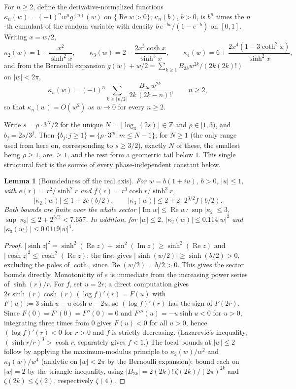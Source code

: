 \documentclass[11pt]{article}
\newtheorem{lemma}[theorem]{Lemma}
\theoremstyle{definition}
\theoremstyle{remark}
\newcommand{\Z}{\mathbb{Z}}
\begin{document}
For $n \ge 2$, define the derivative-normalized functions $\kappa_n(w) = (-1)^n w^n g^{(n)}(w)$ on
$\{\operatorname{Re} w > 0\}$; $\kappa_n(b)$, $b>0$, is $b^n$ times the $n$-th cumulant of the
random variable with density $b\,e^{-bv}/(1-e^{-b})$ on $[0,1]$. Writing $x=w/2$,
\[
\kappa_2(w) = 1 - \frac{x^2}{\sinh^2 x}, \qquad
\kappa_3(w) = 2 - \frac{2x^3\cosh x}{\sinh^3 x}, \qquad
\kappa_4(w) = 6 + \frac{2x^4(1-3\coth^2 x)}{\sinh^2 x},
\]
and from the Bernoulli expansion $g(w)+w/2 = \sum_{k\ge1} B_{2k}w^{2k}/(2k(2k)!)$ on $|w|<2\pi$,
\[
\kappa_n(w) = (-1)^n\!\!\sum_{k\ge\lceil n/2\rceil}\!\! \frac{B_{2k}\,w^{2k}}{2k\,(2k-n)!}, \qquad n\ge2,
\]
so that $\kappa_n(w) = O(w^2)$ as $w \to 0$ for every $n \ge 2$.

Write $s = \rho\cdot 3^N/2$ for the unique $N = \lfloor \log_3(2s)\rfloor \in \Z$ and $\rho \in
[1,3)$, and $b_j = 2s/3^j$. Then $\{b_j : j \ge 1\} = \{\rho\cdot 3^m : m \le N-1\}$; for $N \ge 1$
(the only range used from here on, corresponding to $s \ge 3/2$), exactly $N$ of these, the
smallest being $\rho \ge 1$, are $\ge 1$, and the rest form a geometric tail below $1$. This single
structural fact is the source of every phase-independent constant below.

\begin{lemma}[Boundedness off the real axis]
\label{lem:kappa}
For $w = b(1+iu)$, $b>0$, $|u|\le 1$, with $e(r) = r^2/\sinh^2 r$ and $f(r) = r^3\cosh r/\sinh^3 r$,
\[
|\kappa_2(w)| \le 1 + 2e(b/2), \qquad |\kappa_3(w)| \le 2 + 2\cdot 2^{3/2} f(b/2).
\]
Both bounds are finite over the whole sector $|\operatorname{Im}w|\le\operatorname{Re}w$:
$\sup|\kappa_2|\le3$, $\sup|\kappa_3|\le2+2^{5/2}<7.657$. In addition, for $|w|\le2$,
$|\kappa_2(w)| \le 0.114|w|^2$ and $|\kappa_3(w)|\le 0.0119|w|^4$.
\end{lemma}

\begin{proof}
$|\sinh z|^2 = \sinh^2(\operatorname{Re}z)+\sin^2(\operatorname{Im}z) \ge \sinh^2(\operatorname{Re}z)$
and $|\cosh z|^2 \le \cosh^2(\operatorname{Re}z)$; the first gives $|\sinh(w/2)|\ge\sinh(b/2)>0$,
excluding the poles of $\coth$, since $\operatorname{Re}(w/2)=b/2>0$. This gives the sector bounds directly.
Monotonicity of $e$ is immediate from the increasing power series of $\sinh(r)/r$. For $f$, set
$u=2r$; a direct computation gives $2r\sinh(r)\cosh(r)\,(\log f)'(r) = F(u)$ with
$F(u):=3\sinh u - u\cosh u - 2u$, so $(\log f)'(r)$ has the sign of $F(2r)$. Since
$F(0)=F'(0)=F''(0)=0$ and $F'''(u)=-u\sinh u<0$ for $u>0$, integrating three times from $0$ gives
$F(u)<0$ for all $u>0$, hence $(\log f)'(r)<0$ for $r>0$ and $f$ is strictly decreasing.
(Lazarevi\'c's inequality, $(\sinh r/r)^3 > \cosh r$, separately gives $f<1$.) The local bounds
at $|w|\le2$ follow by applying the maximum-modulus principle to $\kappa_2(w)/w^2$ and
$\kappa_3(w)/w^4$ (analytic on $|w|<2\pi$ by the Bernoulli expansion): bound each on $|w|=2$ by the
triangle inequality, using $|B_{2k}| = 2(2k)!\,\zeta(2k)/(2\pi)^{2k}$ and $\zeta(2k)\le\zeta(2)$,
respectively $\zeta(4)$.
\end{proof}
\end{document}
